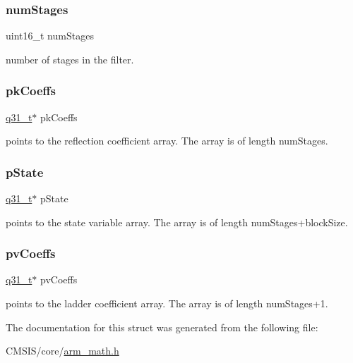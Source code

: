 \subsubsection{\texorpdfstring{numStages}{numStages}}
{\footnotesize\ttfamily uint16\+\_\+t num\+Stages}

number of stages in the filter. \mbox{\label{structarm__iir__lattice__instance__q31_a9d45339bf841bf86aec57be5f70d2b01}} 
\subsubsection{\texorpdfstring{pkCoeffs}{pkCoeffs}}
{\footnotesize\ttfamily \mbox{\hyperlink{arm__math_8h_adc89a3547f5324b7b3b95adec3806bc0}{q31\+\_\+t}}$\ast$ pk\+Coeffs}

points to the reflection coefficient array. The array is of length num\+Stages. \mbox{\label{structarm__iir__lattice__instance__q31_adee4ba3ee8869865af7d8fa08ca913d6}} 
\subsubsection{\texorpdfstring{pState}{pState}}
{\footnotesize\ttfamily \mbox{\hyperlink{arm__math_8h_adc89a3547f5324b7b3b95adec3806bc0}{q31\+\_\+t}}$\ast$ p\+State}

points to the state variable array. The array is of length num\+Stages+block\+Size. \mbox{\label{structarm__iir__lattice__instance__q31_a3d7de56fe9de3458f033a64f14407533}} 
\subsubsection{\texorpdfstring{pvCoeffs}{pvCoeffs}}
{\footnotesize\ttfamily \mbox{\hyperlink{arm__math_8h_adc89a3547f5324b7b3b95adec3806bc0}{q31\+\_\+t}}$\ast$ pv\+Coeffs}

points to the ladder coefficient array. The array is of length num\+Stages+1. 

The documentation for this struct was generated from the following file\+:\begin{DoxyCompactItemize}
\item 
C\+M\+S\+I\+S/core/\mbox{\hyperlink{arm__math_8h}{arm\+\_\+math.\+h}}\end{DoxyCompactItemize}
